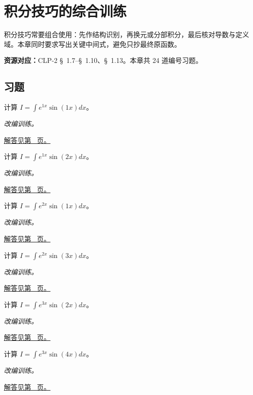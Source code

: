 \documentclass[UTF8,12pt,a4paper,fontset=fandol]{ctexart}
\begin{document}
\clearpage
\section{积分技巧的综合训练}\label{sec:ch15}
积分技巧常要组合使用：先作结构识别，再换元或分部积分，最后核对导数与定义域。本章同时要求写出关键中间式，避免只抄最终原函数。

\textbf{资源对应：}CLP-2 \S~1.7--\S~1.10、\S~1.13。本章共 24 道编号习题。
\subsection{习题}
\begin{example}[指数乘正弦的循环分部积分]\label{ex:c15q1}
计算 $I=\int e^{1x}\sin(1x)dx$。
\par\textit{改编训练。}\par\hyperref[ans:c15q1]{解答见第~\pageref{ans:c15q1} 页。}
\end{example}
\begin{example}[指数乘正弦的循环分部积分]\label{ex:c15q2}
计算 $I=\int e^{1x}\sin(2x)dx$。
\par\textit{改编训练。}\par\hyperref[ans:c15q2]{解答见第~\pageref{ans:c15q2} 页。}
\end{example}
\begin{example}[指数乘正弦的循环分部积分]\label{ex:c15q3}
计算 $I=\int e^{2x}\sin(1x)dx$。
\par\textit{改编训练。}\par\hyperref[ans:c15q3]{解答见第~\pageref{ans:c15q3} 页。}
\end{example}
\begin{example}[指数乘正弦的循环分部积分]\label{ex:c15q4}
计算 $I=\int e^{2x}\sin(3x)dx$。
\par\textit{改编训练。}\par\hyperref[ans:c15q4]{解答见第~\pageref{ans:c15q4} 页。}
\end{example}
\begin{example}[指数乘正弦的循环分部积分]\label{ex:c15q5}
计算 $I=\int e^{3x}\sin(2x)dx$。
\par\textit{改编训练。}\par\hyperref[ans:c15q5]{解答见第~\pageref{ans:c15q5} 页。}
\end{example}
\begin{example}[指数乘正弦的循环分部积分]\label{ex:c15q6}
计算 $I=\int e^{3x}\sin(4x)dx$。
\par\textit{改编训练。}\par\hyperref[ans:c15q6]{解答见第~\pageref{ans:c15q6} 页。}
\end{example}
\end{document}
